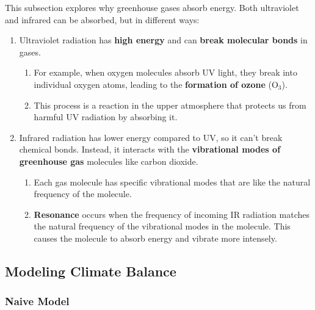 \documentclass[a4paper,12pt]{article}
\begin{document}
This subsection explores why greenhouse gases absorb energy. Both ultraviolet and infrared can be absorbed, but in different ways:
\begin{enumerate}
  \item Ultraviolet radiation has \textbf{high energy} and can \textbf{break molecular bonds} in gases.
        \begin{enumerate}
          \item For example, when oxygen molecules absorb UV light, they break into individual oxygen atoms, leading to the \textbf{formation of ozone} (O$_3$).
          \item This process is a reaction in the upper atmosphere that protects us from harmful UV radiation by absorbing it.
        \end{enumerate}
  \item Infrared radiation has lower energy compared to UV, so it can't break chemical bonds. Instead, it interacts with the \textbf{vibrational modes of greenhouse gas} molecules like carbon dioxide.
        \begin{enumerate}
          \item Each gas molecule has specific vibrational modes that are like the natural frequency of the molecule.
          \item \textbf{Resonance} occurs when the frequency of incoming IR radiation matches the natural frequency of the vibrational modes in the molecule. This causes the molecule to absorb energy and vibrate more intensely.
        \end{enumerate}
\end{enumerate}

\subsection{Modeling Climate Balance}

\subsubsection{Naive Model}
\end{document}
